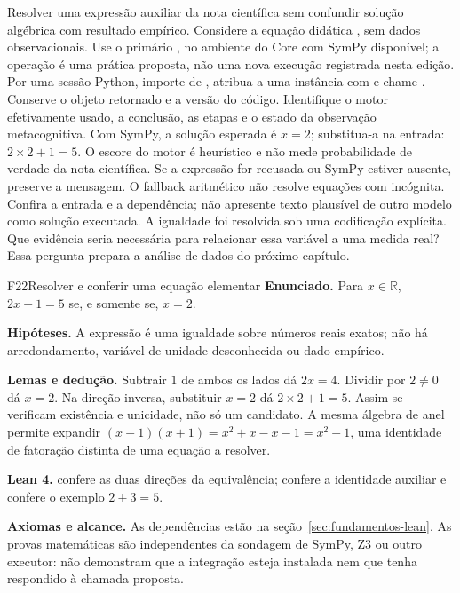 \praticacore
{Resolver uma expressão auxiliar da nota científica sem confundir solução algébrica com resultado empírico.}
{Considere a equação didática , sem dados observacionais. Use o primário , no ambiente do Core com SymPy disponível; a operação é uma prática proposta, não uma nova execução registrada nesta edição.}
{Por uma sessão Python, importe  de , atribua a  uma instância com  e chame . Conserve o objeto retornado e a versão do código.}
{Identifique o motor efetivamente usado, a conclusão, as etapas e o estado da observação metacognitiva. Com SymPy, a solução esperada é $x=2$; substitua-a na entrada: $2\times2+1=5$. O escore do motor é heurístico e não mede probabilidade de verdade da nota científica.}
{Se a expressão for recusada ou SymPy estiver ausente, preserve a mensagem. O fallback aritmético não resolve equações com incógnita. Confira a entrada e a dependência; não apresente texto plausível de outro modelo como solução executada.}
{A igualdade foi resolvida sob uma codificação explícita. Que evidência seria necessária para relacionar essa variável a uma medida real? Essa pergunta prepara a análise de dados do próximo capítulo.}

\begin{formalizacao}{F22}{Resolver e conferir uma equação elementar}
\textbf{Enunciado.} Para $x\in\mathbb R$, $2x+1=5$ se, e somente se, $x=2$.

\textbf{Hipóteses.} A expressão é uma igualdade sobre números reais exatos; não há arredondamento, variável de unidade desconhecida ou dado empírico.

\textbf{Lemas e dedução.} Subtrair $1$ de ambos os lados dá $2x=4$. Dividir por $2\ne0$ dá $x=2$. Na direção inversa, substituir $x=2$ dá $2\times2+1=5$. Assim se verificam existência e unicidade, não só um candidato. A mesma álgebra de anel permite expandir $(x-1)(x+1)=x^2+x-x-1=x^2-1$, uma identidade de fatoração distinta de uma equação a resolver.

\textbf{Lean 4.}  confere as duas direções da equivalência;  confere a identidade auxiliar e  confere o exemplo $2+3=5$.

\textbf{Axiomas e alcance.} As dependências estão na seção~\ref{sec:fundamentos-lean}. As provas matemáticas são independentes da sondagem de SymPy, Z3 ou outro executor: não demonstram que a integração esteja instalada nem que tenha respondido à chamada proposta.
\end{formalizacao}

